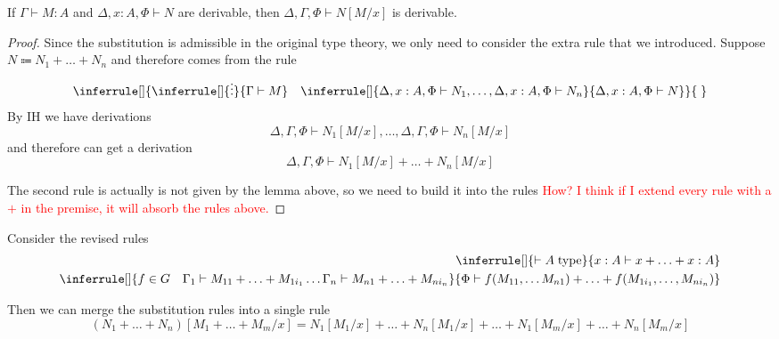 \documentclass[acmsmall,screen, nonacm, anonymous]{acmart}
\begin{document}
\begin{lemma}
  If $\Gamma \vdash M : A$ and $\Delta, x : A, \Phi \vdash N$ are derivable, then $\Delta, \Gamma, \Phi \vdash N[M/x]$ is derivable.
\end{lemma}
\begin{proof}
  Since the substitution is admissible in the original type theory, we only need to consider the extra rule that we introduced.
  Suppose $N \Coloneqq N_1 + \ldots + N_n$ and therefore comes from the rule
  \[
  \inferrule[]{\inferrule[]{\vdots}{\Gamma \vdash M} \quad \inferrule[]{\Delta, x : A, \Phi \vdash N_1, \ldots, \Delta, x : A, \Phi \vdash N_n}{\Delta, x : A, \Phi \vdash N}}{\;}
  \]
  By IH we have derivations
  \[
    \Delta, \Gamma, \Phi \vdash N_1[M/x], \ldots, \Delta, \Gamma, \Phi \vdash N_n[M/x]
  \]
  and therefore can get a derivation 
  \[
  \Delta, \Gamma, \Phi \vdash N_1[M/x] + \ldots + N_n[M/x]
  \]

  The second rule is actually is not given by the lemma above, so we need to build it into the rules \textcolor{red}{How? I think if I extend every rule with a $+$ in the premise, it will absorb the rules above.}

\end{proof}

Consider the revised rules
\begin{align*}
  \inferrule[]{\vdash A\;\text{type}}{x : A \vdash x + \ldots + x : A}\\
  \inferrule[]{f \in G \quad \Gamma_1 \vdash M_{11} + \ldots + M_{1 i_1} \ldots \Gamma_n \vdash M_{n 1} + \ldots + M_{n i_n}}{\Phi \vdash f(M_{1 1}, \ldots M_{n 1}) + \ldots + f(M_{1 i_1}, \ldots, M_{n i_n})}
\end{align*}

Then we can merge the substitution rules into a single rule
\[
(N_1 + \ldots + N_n)[M_1 + \ldots + M_m / x] = N_1[M_1 / x] + \ldots + N_n[M_1 / x] + \ldots + N_1[M_m / x] + \ldots + N_n[M_m / x]
\]
\end{document}
